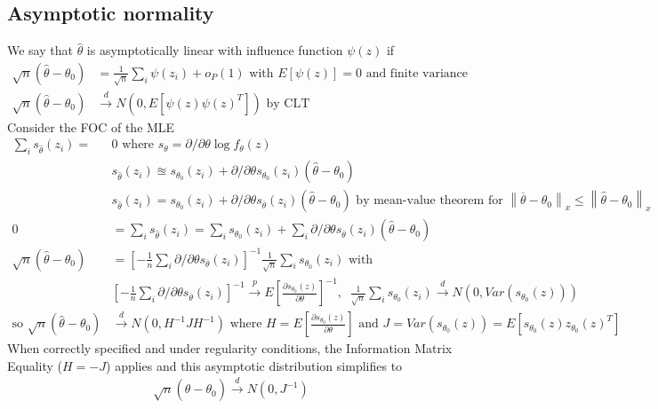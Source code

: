 \documentclass{article}
\newcommand{\norm}[2]{\left\lVert#1\right\rVert_#2}
\begin{document}
\subsection{Asymptotic normality}
We say that $\hat{\theta}$ is asymptotically linear with influence function $\psi(z)$ if 
\begin{align*}
  \sqrt{n}(\hat{\theta} - \theta_0) &= \frac{1}{\sqrt{n}}\sum_i\psi(z_i) + o_P(1) \textrm{ with } E[\psi(z)] = 0 \textrm{ and finite variance}\\
  \sqrt{n}(\hat{\theta} - \theta_0) &\overset{d}{\longrightarrow} N(0, E[\psi(z)\psi(z)^T]) \textrm{ by CLT}
\end{align*} 
Consider the FOC of the MLE
\begin{align*}
  \sum_i s_{\hat{\theta}}(z_i) =& 0 \textrm{ where } s_\theta = \partial/\partial\theta \log f_\theta(z)\\
  &s_{\hat{\theta}}(z_i) \approxeq s_{\theta_0}(z_i) + \partial/\partial\theta s_{\theta_0}(z_i)(\hat{\theta} - \theta_0) \\
  &s_{\hat{\theta}}(z_i) = s_{\theta_0}(z_i) + \partial/\partial\theta s_{\overline{\theta}}(z_i)(\hat{\theta} - \theta_0) \textrm{ by mean-value theorem for } \norm{\overline{\theta} - \theta_0}{x} \leq \norm{\hat{\theta} - \theta_0}{x}\\
  0 &= \sum_i s_{\hat{\theta}}(z_i) = \sum_i s_{\theta_0}(z_i) + \sum_i \partial/\partial\theta s_{\overline{\theta}}(z_i)(\hat{\theta} - \theta_0)\\
  \sqrt{n}(\hat{\theta} - \theta_0) &= \left[-\frac{1}{n}\sum_i \partial/\partial\theta s_{\overline{\theta}}(z_i)\right]^{-1} \frac{1}{\sqrt{n}}\sum_i s_{\theta_0}(z_i) \textrm{ with }\\
  & \left[-\frac{1}{n}\sum_i \partial/\partial\theta s_{\overline{\theta}}(z_i)\right]^{-1} \overset{p}{\longrightarrow} E\left[\frac{\partial s_{\theta_0}(z)}{\partial\theta}\right]^{-1}, \;\; \frac{1}{\sqrt{n}}\sum_i s_{\theta_0}(z_i) \overset{d}{\longrightarrow} N(0, Var(s_{\theta_0}(z)))\\
  \textrm{so } \sqrt{n}(\hat{\theta} - \theta_0) &\overset{d}{\longrightarrow} N(0, H^{-1}JH^{-1}) \textrm{ where } H = E\left[\frac{\partial s_{\theta_0}(z)}{\partial\theta}\right] \textrm{ and } J = Var(s_{\theta_0}(z)) = E[s_{\theta_0}(z)z_{\theta_0}(z)^T]
\end{align*}
When correctly specified and under regularity conditions, the Information Matrix Equality ($H = -J$) applies and this asymptotic distribution simplifies to 
\begin{align*}
  \sqrt{n}(\hat{\theta} - \theta_0) \overset{d}{\longrightarrow} N(0, J^{-1})
\end{align*}
\end{document}
